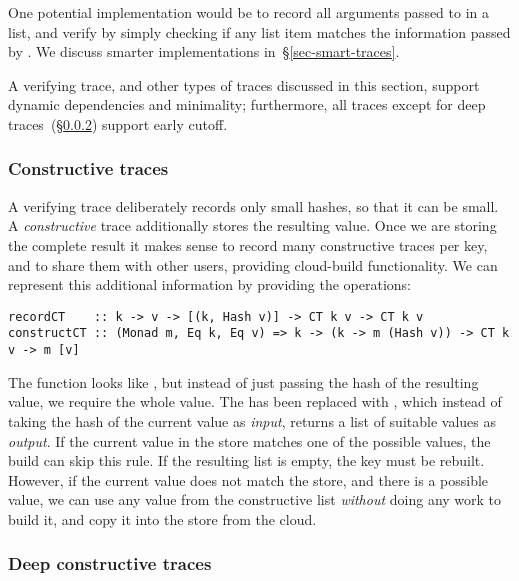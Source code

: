 One potential implementation would be to record all arguments passed to
 in a list, and verify by simply checking if any list item matches
the information passed by .  We discuss smarter implementations
in~\S\ref{sec-smart-traces}.

A verifying trace, and other types of traces discussed in this section, support
dynamic dependencies and minimality; furthermore, all traces except for deep
traces~(\S\ref{sec-deep-constructive-traces}) support early cutoff.

\subsubsection{Constructive traces}\label{sec-constructive-traces}

A verifying trace deliberately records only small hashes, so that it can be small.
A \emph{constructive} trace additionally stores the resulting value.
Once we are storing the complete result it makes sense
to record many constructive traces per key, and to share them with other users,
providing cloud-build functionality. We can represent this additional
information by providing the operations:

\begin{verbatim}
recordCT    :: k -> v -> [(k, Hash v)] -> CT k v -> CT k v
constructCT :: (Monad m, Eq k, Eq v) => k -> (k -> m (Hash v)) -> CT k v -> m [v]
\end{verbatim}

\noindent
The function  looks like , but instead of just passing
the hash of the resulting value, we require the whole value. The 
has been replaced with , which instead of taking the hash of the
current value as \emph{input}, returns a list of suitable values as \emph{output}.
If the current value in the store
matches one of the possible values, the build can skip this rule. If the
resulting list is empty, the key must be rebuilt. However, if the current value
does not match the store, and there is a possible value, we can use any value
from the constructive list \emph{without} doing any work to build it, and copy
it into the store from the cloud.

\subsubsection{Deep constructive traces}\label{sec-deep-constructive-traces}

